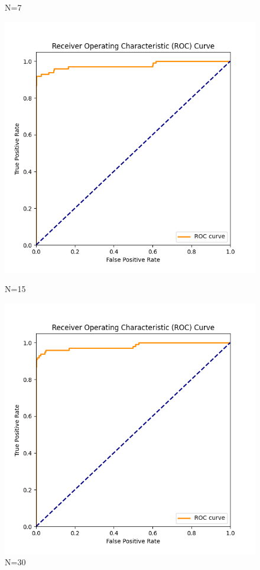 \documentclass[8pt]{article}
\begin{document}
\begin{figure}[H]
\begin{minipage}{0.24\textwidth}
        \caption{N=7}
        \label{fig:roc_curve_N_7_K_7}
    \end{minipage}
    \begin{minipage}{0.24\textwidth}
        \centering
        \includegraphics[width=\textwidth]{../Prob1/out/rand_seed_14/task3/roc_curve_N_15_K_7.png}
        \caption{N=15}
        \label{fig:roc_curve_N_15_K_7}
    \end{minipage}
    \begin{minipage}{0.24\textwidth}
        \centering
        \includegraphics[width=\textwidth]{../Prob1/out/rand_seed_14/task3/roc_curve_N_30_K_7.png}
        \caption{N=30}
        \label{fig:roc_curve_N_30_K_7}
    \end{minipage}
\end{figure}
\end{document}
